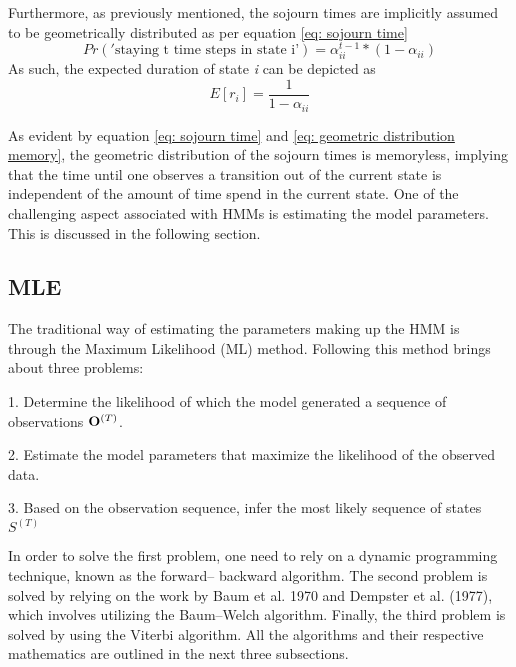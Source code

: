 Furthermore, as previously mentioned, the sojourn times are implicitly assumed to be geometrically distributed as per equation \ref{eq: sojourn time}
\begin{equation}
    Pr('\text{staying t time steps in state i'}) = \alpha^{t-1}_{ii} *(1-\alpha_{ii})
    \label{eq: sojourn time}
\end{equation}
As such, the expected duration of state \textit{i} can be depicted as 
\begin{equation}
    E[r_i] = \frac{1}{1-\alpha_{ii}}
    \label{eq: geometric distribution memory}
\end{equation}

As evident by equation \ref{eq: sojourn time} and \ref{eq: geometric distribution memory}, the geometric distribution of the sojourn times is memoryless, implying that the time until one observes a transition out of the current state is independent of the amount of time spend in the current state. One of the challenging aspect associated with HMMs is estimating the model parameters. This is discussed in the following section.

\subsection{MLE}
The traditional way of estimating the parameters making up the HMM is through the Maximum Likelihood
(ML) method. Following this method brings about three problems:

    1. Determine the likelihood of which the model generated a sequence of  observations $\bold{O}^{(T)}$. 
    
    2. Estimate the model parameters that maximize the likelihood of the observed data.

    3. Based on the observation sequence, infer the most likely sequence of states $S^{(T)}$
\label{subsection: MLE}
 
In order to solve the first problem, one need to rely on a dynamic programming technique, known as the forward–
backward algorithm. The second problem is solved by relying on the work by Baum et al. 1970 and Dempster et al. (1977), which involves utilizing the Baum–Welch
algorithm. Finally, the third problem is solved by using the Viterbi algorithm. All the algorithms and their respective mathematics are outlined in the next three subsections. 
 
